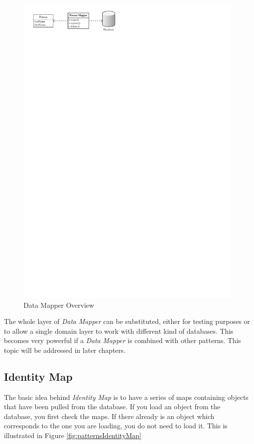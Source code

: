 			\begin{figure}[htb]
				\begin{center}
					\includegraphics{./files/inc/figures/patternsDataMapperOverview}
					\caption{\label{fig:patternsDataMapperOverview} Data Mapper Overview}
				\end{center}
			\end{figure}
			The whole layer of \textit{Data Mapper} can be substituted, either for testing purposes
			or to allow a single domain layer to work with different kind of databases. This
			becomes very powerful if a \textit{Data Mapper} is combined with other patterns. This topic
			will be addressed in later chapters.
			
		\subsection{Identity Map}
		\label{subsec:identityMap}
			The basic idea behind \textit{Identity Map} is to have a series of maps containing objects
			that have been pulled from the database. If you load an object from the database,
			you first check the maps. If there already is an object which corresponds to the
			one you are loading, you do not need to load it. This is illustrated in Figure
			\ref{fig:patternsIdentityMap} 

